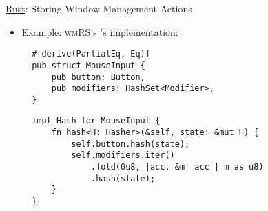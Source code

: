 \begin{frame}[fragile]{\underline{Rust}: Storing Window Management Actions \hfill {\footnotesize \currentname}}


    \begin{itemize}

        \item Example: \textsc{wmRS}'s 's  implementation:\\[3pt] 
\begin{verbatim}
  #[derive(PartialEq, Eq)]
  pub struct MouseInput {
      pub button: Button,
      pub modifiers: HashSet<Modifier>,
  }
\end{verbatim}
\begin{verbatim}
  impl Hash for MouseInput {
      fn hash<H: Hasher>(&self, state: &mut H) {
          self.button.hash(state);
          self.modifiers.iter()
              .fold(0u8, |acc, &m| acc | m as u8)
              .hash(state);
      }
  }
\end{verbatim}

    \end{itemize}

    \vfill

\end{frame}

